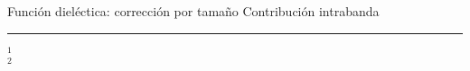 \begin{frame}{Función dieléctica: corrección por tamaño}
{Contribución intrabanda}\small
 \begin{figure} \centering
\def\svgwidth{.7\textwidth}
\end{figure}
	\noindent\rule{.25\textwidth}{0.4pt}
 \begin{spacing}{0}\fontsize{4}{12} \selectfont
	$^1$ \\
	$^2$ 
	\end{spacing}
\end{frame}



